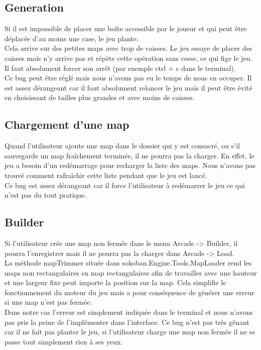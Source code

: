 \documentclass[../main.tex]{subfiles}
\begin{document}
\subsection{Generation}
Si il est impossible de placer une boîte accessible par le joueur et qui peut être déplacée d'au moins une case, le jeu plante. \\

Cela arrive sur des petites maps avec trop de caisses. Le jeu essaye de placer des caisses mais n'y arrive pas et répète cette opération sans cesse, ce qui fige le jeu. Il faut absolument forcer son arrêt (par exemple ctrl + c dans le terminal). \\

Ce bug peut être réglé mais nous n’avons pas eu le temps de nous en occuper. Il est assez dérangeant car il faut absolument relancer le jeu mais il peut être évité en choisissant de tailles plus grandes et avec moins de caisses.

\subsection{Chargement d'une map}
Quand l’utilisateur ajoute une map dans le dossier qui y est consacré, ou s'il sauvegarde un map fraîchement terminée, il ne pourra pas la charger.
En effet, le jeu a besoin d’un redémarrage pour recharger la liste des maps. Nous n’avons pas trouvé comment rafraîchir cette liste pendant que le jeu est lancé. \\ 

Ce bug est assez dérangeant car il force l’utilisateur à redémarrer le jeu ce qui n’est pas du tout pratique.

\subsection{Builder}
Si l’utilisateur crée une map non fermée dans le menu Arcade -> Builder, il pourra l’enregistrer mais il ne pourra pas la charger dans Arcade -> Load. \\
La méthode mapTrimmer située dans sokoban.Engine.Tools.MapLoader rend les maps non rectangulaires en map rectangulaires afin de travailler avec une hauteur et une largeur fixe peut importe la position sur la map. Cela simplifie le fonctionnement du moteur du jeu mais a pour conséquence de générer une erreur si une map n’est pas fermée. \\

Dans notre cas l’erreur est simplement indiquée dans le terminal et nous n’avons pas pris la peine de l'implémenter dans l’interface. Ce bug n’est pas très gênant car il ne fait pas planter le jeu, si l’utilisateur charge une map non fermée il ne se passe tout simplement rien à ses yeux.

\newpage
\end{document}
